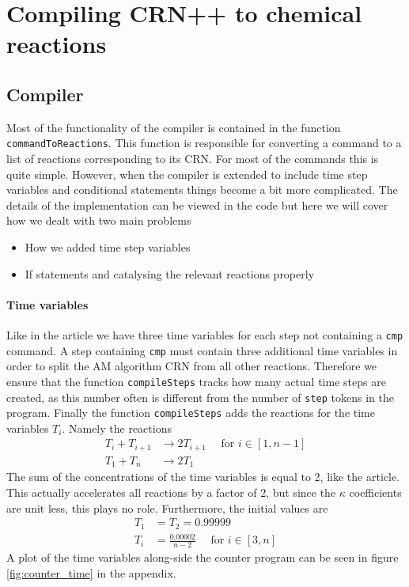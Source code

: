 \section{Compiling CRN++ to chemical reactions}

\subsection{Compiler}
Most of the functionality of the compiler is contained in the function \texttt{commandToReactions}. This function is responsible for converting a command to a list of reactions corresponding to its CRN. For most of the commands this is quite simple. However, when the compiler is extended to include time step variables and conditional statements things become a bit more complicated. The details of the implementation can be viewed in the code but here we will cover how we dealt with two main problems
\begin{itemize}
    \item How we added time step variables
    \item If statements and catalysing the relevant reactions properly
\end{itemize}
\paragraph{Time variables}
Like in the article we have three time variables for each step not containing a \texttt{cmp} command. A step containing \texttt{cmp} must contain three additional time variables in order to split the AM algorithm CRN from all other reactions. Therefore we ensure that the function \texttt{compileSteps} tracks how many actual time steps are created, as this number often is different from the number of \texttt{step} tokens in the program. Finally the function \texttt{compileSteps} adds the reactions for the time variables $T_i$. Namely the reactions 
\begin{align*}
    T_i + T_{i+1} &\rightarrow 2 T_{i+1} \quad\text{ for } i \in [1,n-1]\\
    T_1 + T_n &\rightarrow 2 T_1
\end{align*}
The sum of the concentrations of the time variables is equal to 2, like the article. This actually accelerates all reactions by a factor of 2, but since the $\kappa$ coefficients are unit less, this plays no role. Furthermore, the initial values are 
\begin{align*}
    T_1 &= T_2 = 0.99999\\
    T_i &= \frac{0.00002}{n-2} \quad\text{ for } i \in [3,n]
\end{align*}
A plot of the time variables along-side the counter program can be seen in figure \ref{fig:counter_time} in the appendix. 
